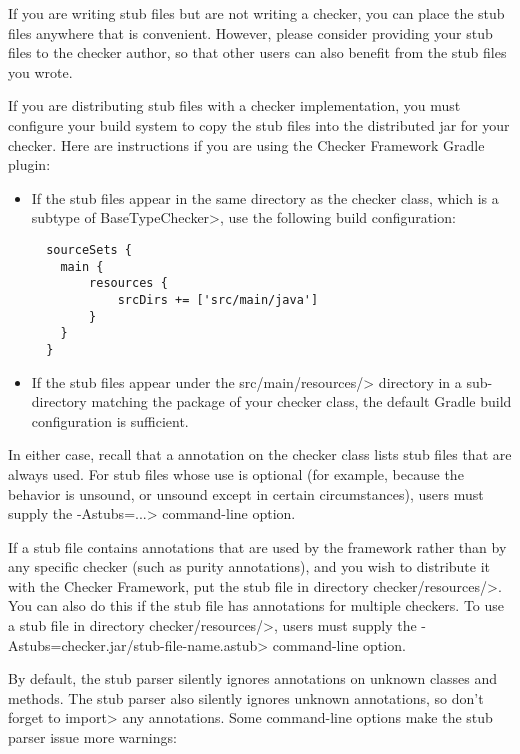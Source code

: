 
If you are writing stub files but are not writing a checker, you can place
the stub files anywhere that is convenient.  However, please consider
providing your stub files to the checker author, so that other users can
also benefit from the stub files you wrote.

If you are distributing stub files with a checker implementation, you must
configure your build system to copy the stub files into the distributed jar for
your checker.  Here are instructions if you are using the Checker Framework
Gradle plugin:
\begin{itemize}
\item
  If the stub files appear in the same directory as the checker class, which is
  a subtype of \<BaseTypeChecker>, use the following build configuration:
\begin{Verbatim}
  sourceSets {
    main {
        resources {
            srcDirs += ['src/main/java']
        }
    }
  }
\end{Verbatim}
\item
  If the stub files appear under the \<src/main/resources/>
  directory in a sub-directory matching the package of your checker class,
  the default Gradle build configuration is sufficient.
\end{itemize}
In either case, recall that a 
annotation on the checker class lists stub files that are always used.  For
stub files whose use is optional (for example, because the behavior is
unsound, or unsound except in certain circumstances), users must supply the
\<-Astubs=...> command-line option.


If a stub file contains annotations that are used by the framework rather
than by any specific checker (such as purity annotations), and you wish to
distribute it with the Checker Framework, put the stub file in directory
\<checker/resources/>.  You can also do this if the stub file has
annotations for multiple checkers.  To use a stub file in directory
\<checker/resources/>, users must supply the
\<-Astubs=checker.jar/stub-file-name.astub> command-line option.





By default, the stub parser silently ignores
annotations on unknown classes and methods.
The stub parser also silently ignores unknown annotations, so don't forget to
\<import> any annotations.
Some command-line options make the stub parser issue more warnings:


